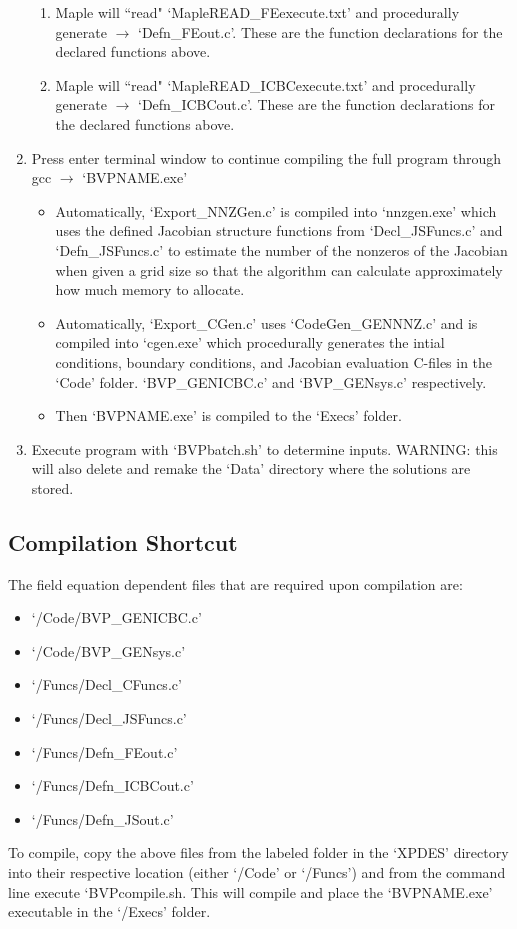 \documentclass{article}
\newcommand{\rarr}{\rightarrow}
\begin{document}
\begin{enumerate}
\begin{enumerate}
\item Maple will ``read" `MapleREAD\_FEexecute.txt' and procedurally generate $\rarr$ `Defn\_FEout.c'. These are the function declarations for the declared functions above.
\item Maple will ``read" `MapleREAD\_ICBCexecute.txt' and procedurally generate $\rarr$ `Defn\_ICBCout.c'. These are the function declarations for the declared functions above.
\end{enumerate}
\item Press enter terminal window to continue compiling the full program through gcc $\rarr$ `BVPNAME.exe'
\begin{itemize}
\item Automatically, `Export\_NNZGen.c' is compiled into `nnzgen.exe' which uses the defined Jacobian structure functions from `Decl\_JSFuncs.c' and `Defn\_JSFuncs.c' to estimate the number of the nonzeros of the Jacobian when given a grid size so that the algorithm can calculate approximately how much memory to allocate.
\item Automatically, `Export\_CGen.c' uses `CodeGen\_GENNNZ.c' and is compiled into `cgen.exe' which procedurally generates the intial conditions, boundary conditions, and Jacobian evaluation C-files in the `Code' folder. `BVP\_GENICBC.c' and `BVP\_GENsys.c' respectively.
\item Then `BVPNAME.exe' is compiled to the `Execs' folder.
\end{itemize}
\item Execute program with `BVPbatch.sh' to determine inputs. WARNING: this will also delete and remake the `Data' directory where the solutions are stored.
\end{enumerate}




\subsection{Compilation Shortcut}
\label{ssec:short}

The field equation dependent files that are required upon compilation are:
\begin{itemize}
\item `/Code/BVP\_GENICBC.c'
\item `/Code/BVP\_GENsys.c'
\item `/Funcs/Decl\_CFuncs.c'
\item `/Funcs/Decl\_JSFuncs.c'
\item `/Funcs/Defn\_FEout.c'
\item `/Funcs/Defn\_ICBCout.c'
\item `/Funcs/Defn\_JSout.c'
\end{itemize}

To compile, copy the above files from the labeled folder in the `XPDES' directory into their respective location (either `/Code' or `/Funcs') and from the command line execute `BVPcompile.sh. This will compile and place the `BVPNAME.exe' executable in the `/Execs' folder.




\end{document}
